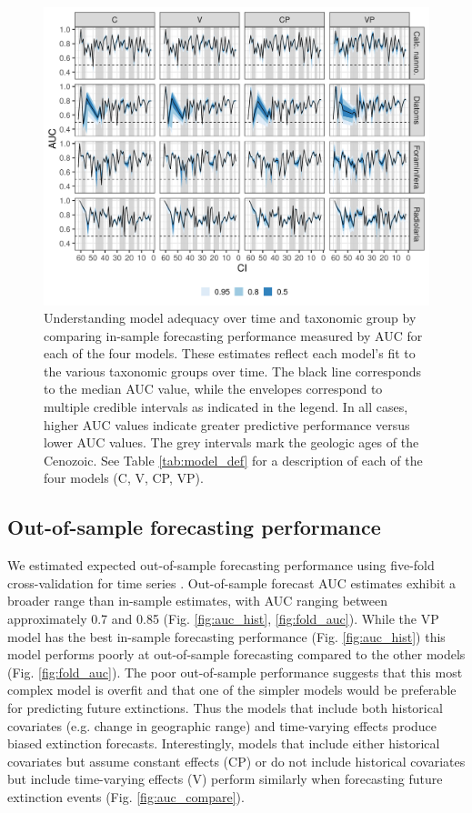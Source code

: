 \documentclass[12pt,letterpaper]{article}
\begin{document}
\begin{refsection}
\begin{figure}[ht]
 \centering
 \includegraphics[width=\textwidth,height=0.5\textheight,keepaspectratio=true]{../results/figure/auc_taxon_time_full}
 \caption{Understanding model adequacy over time and taxonomic group by comparing in-sample forecasting performance measured by AUC for each of the four models. These estimates reflect each model's fit to the various taxonomic groups over time. The black line corresponds to the median AUC value, while the envelopes correspond to multiple credible intervals as indicated in the legend. In all cases, higher AUC values indicate greater predictive performance versus lower AUC values. The grey intervals mark the geologic ages of the Cenozoic. See Table \ref{tab:model_def} for a description of each of the four models (C, V, CP, VP).}
 \label{fig:auc_taxon_time}
\end{figure}




\subsection{Out-of-sample forecasting performance}

We estimated expected out-of-sample forecasting performance using five-fold cross-validation for time series \citep{Arlot2010,Bergmeir2016}. Out-of-sample forecast AUC estimates exhibit a broader range than in-sample estimates, with AUC ranging between approximately 0.7 and 0.85 (Fig. \ref{fig:auc_hist}, \ref{fig:fold_auc}). While the VP model has the best in-sample forecasting performance (Fig. \ref{fig:auc_hist}) this model performs poorly at out-of-sample forecasting compared to the other models (Fig. \ref{fig:fold_auc}). The poor out-of-sample performance suggests that this most complex model is overfit and that one of the simpler models would be preferable for predicting future extinctions. Thus the models that include both historical covariates (e.g. change in geographic range) and time-varying effects produce biased extinction forecasts. Interestingly, models that include either historical covariates but assume constant effects (CP) or do not include historical covariates but include time-varying effects (V) perform similarly when forecasting future extinction events (Fig. \ref{fig:auc_compare}). 



\end{refsection}
\end{document}
